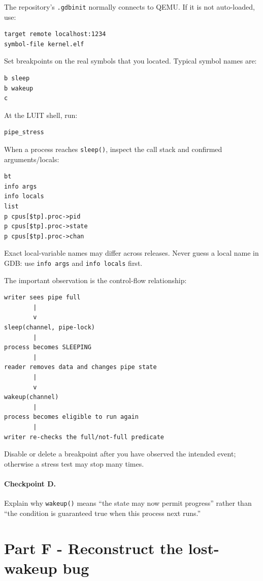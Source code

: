 \documentclass[11pt,a4paper]{article}
\newcommand{\file}[1]{\texttt{#1}}
\begin{document}
The repository's \file{.gdbinit} normally connects to QEMU. If it is not auto-loaded, use:

\begin{lstlisting}
target remote localhost:1234
symbol-file kernel.elf
\end{lstlisting}

Set breakpoints on the real symbols that you located. Typical symbol names are:

\begin{lstlisting}
b sleep
b wakeup
c
\end{lstlisting}

At the LUIT shell, run:

\begin{lstlisting}
pipe_stress
\end{lstlisting}

When a process reaches \file{sleep()}, inspect the call stack and confirmed arguments/locals:

\begin{lstlisting}
bt
info args
info locals
list
p cpus[$tp].proc->pid
p cpus[$tp].proc->state
p cpus[$tp].proc->chan
\end{lstlisting}

Exact local-variable names may differ across releases. Never guess a local name in GDB: use \file{info args} and \file{info locals} first.

The important observation is the control-flow relationship:

\begin{lstlisting}
writer sees pipe full
        |
        v
sleep(channel, pipe-lock)
        |
process becomes SLEEPING
        |
reader removes data and changes pipe state
        |
        v
wakeup(channel)
        |
process becomes eligible to run again
        |
writer re-checks the full/not-full predicate
\end{lstlisting}

Disable or delete a breakpoint after you have observed the intended event; otherwise a stress test may stop many times.

\paragraph{Checkpoint D.} Explain why \file{wakeup()} means ``the state may now permit progress'' rather than ``the condition is guaranteed true when this process next runs.''

\section{Part F - Reconstruct the lost-wakeup bug}
\end{document}
